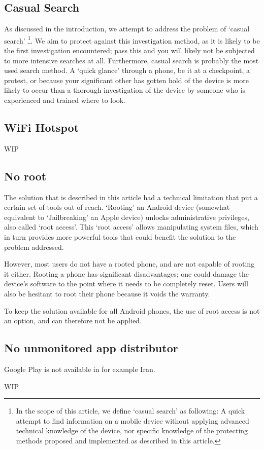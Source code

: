\subsection{Casual Search}
As discussed in the introduction, we attempt to address the problem of `casual search'
\footnote{In the scope of this article, we define `casual search' as following: A quick attempt to find information on a mobile device without applying advanced technical knowledge of the device, nor specific knowledge of the protecting methods proposed and implemented as described in this article.}.
We aim to protect against this investigation method, as it is likely to be the first investigation encountered; pass this and you will likely not be subjected to more intensive searches at all.
Furthermore, casual search is probably the most used search method. 
A `quick glance' through a phone, be it at a checkpoint, a protest, or because your significant other has gotten hold of the device is more likely to occur than a thorough investigation of the device by someone who is experienced and trained where to look.

\subsection{WiFi Hotspot}
WIP
\subsection{No root}
The solution that is described in this article had a technical limitation that put a certain set of tools out of reach.
`Rooting' an Android device (somewhat equivalent to `Jailbreaking' an Apple device) unlocks administrative privileges, also called `root access'.
This `root access' allows manipulating system files, which in turn provides more powerful tools that could benefit the solution to the problem addressed.

However, most users do not have a rooted phone, and are not capable of rooting it either. 
Rooting a phone has significant disadvantages; one could damage the device's software to the point where it needs to be completely reset.
Users will also be hesitant to root their phone because it voids the warranty.

To keep the solution available for all Android phones, the use of root access is not an option, and can therefore not be applied.
\subsection{No unmonitored app distributor}
Google Play is not available in for example Iran.

WIP
